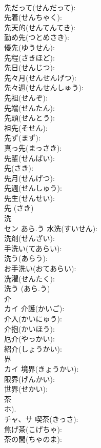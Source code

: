 \documentclass[8pt]{extreport}
\begin{document}
\begin{CJK}{UTF8}{min}
\\	先だって(せんだって): 
\\	先着(せんちゃく): 
\\	先天的(せんてんてき): 
\\	勤め先(つとめさき): 
\\	優先(ゆうせん): 
\\	先程(さきほど): 
\\	先日(せんじつ): 
\\	先々月(せんせんげつ): 
\\	先々週(せんせんしゅう): 
\\	先祖(せんぞ): 
\\	先端(せんたん): 
\\	先頭(せんとう): 
\\	祖先(そせん): 
\\	先ず(まず): 
\\	真っ先(まっさき): 
\\	先輩(せんぱい): 
\\	先(さき): 
\\	先月(せんげつ): 
\\	先週(せんしゅう): 
\\	先生(せんせい): 
\\	先 (さき)
\\	洗			
\\	セン	あら.う	水洗(すいせん): 
\\	洗剤(せんざい): 
\\	手洗い(てあらい): 
\\	洗う(あらう): 
\\	お手洗い(おてあらい): 
\\	洗濯(せんたく): 
\\	洗う (あら.う)
\\	介			
\\	カイ		介護(かいご): 
\\	介入(かいにゅう): 
\\	介抱(かいほう): 
\\	厄介(やっかい): 
\\	紹介(しょうかい): 
\\	界			
\\	カイ		境界(きょうかい): 
\\	限界(げんかい): 
\\	世界(せかい): 
\\	茶			
\\	ホ).
\\	チャ、サ		喫茶(きっさ): 
\\	焦げ茶(こげちゃ): 
\\	茶の間(ちゃのま): 

\end{CJK}
\end{document}
